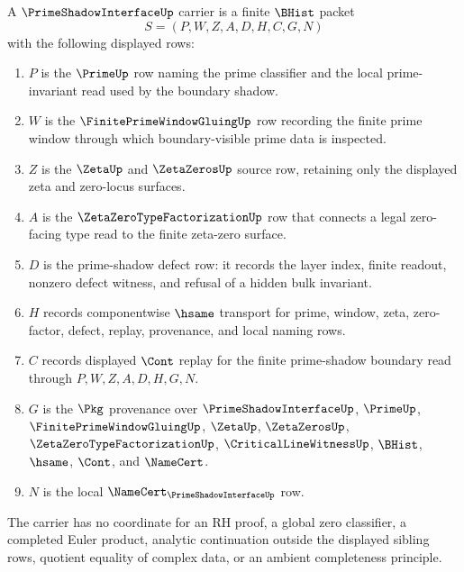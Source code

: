 \begin{definition}
\label{def:prime-shadow-interface-carrier}
A $\PrimeShadowInterfaceUp$ carrier is a finite $\BHist$ packet
$$
S=(P,W,Z,A,D,H,C,G,N)
$$
with the following displayed rows:
\begin{enumerate}
\item $P$ is the $\PrimeUp$ row naming the prime classifier and the local prime-invariant read used by the boundary shadow.
\item $W$ is the $\FinitePrimeWindowGluingUp$ row recording the finite prime window through which boundary-visible prime data is inspected.
\item $Z$ is the $\ZetaUp$ and $\ZetaZerosUp$ source row, retaining only the displayed zeta and zero-locus surfaces.
\item $A$ is the $\ZetaZeroTypeFactorizationUp$ row that connects a legal zero-facing type read to the finite zeta-zero surface.
\item $D$ is the prime-shadow defect row: it records the layer index, finite readout, nonzero defect witness, and refusal of a hidden bulk invariant.
\item $H$ records componentwise $\hsame$ transport for prime, window, zeta, zero-factor, defect, replay, provenance, and local naming rows.
\item $C$ records displayed $\Cont$ replay for the finite prime-shadow boundary read through $P,W,Z,A,D,H,G,N$.
\item $G$ is the $\Pkg$ provenance over $\PrimeShadowInterfaceUp$, $\PrimeUp$, $\FinitePrimeWindowGluingUp$, $\ZetaUp$, $\ZetaZerosUp$, $\ZetaZeroTypeFactorizationUp$, $\CriticalLineWitnessUp$, $\BHist$, $\hsame$, $\Cont$, and $\NameCert$.
\item $N$ is the local $\NameCert_{\PrimeShadowInterfaceUp}$ row.
\end{enumerate}
The carrier has no coordinate for an RH proof, a global zero classifier, a completed Euler product, analytic continuation outside the displayed sibling rows, quotient equality of complex data, or an ambient completeness principle.
\end{definition}

